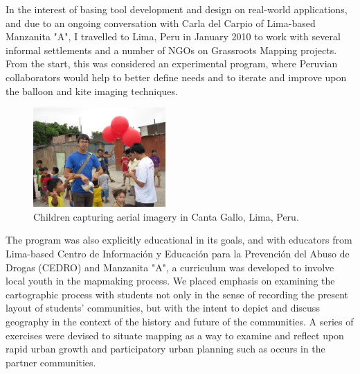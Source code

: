 \documentclass[11pt]{report}
\begin{document}
In the interest of basing tool development and design on real-world applications, and due to an ongoing conversation with Carla del Carpio of Lima-based Manzanita "A", I travelled to Lima, Peru in January 2010 to work with several informal settlements and a number of NGOs on Grassroots Mapping projects. From the start, this was considered an experimental program, where Peruvian collaborators would help to better define needs and to iterate and improve upon the balloon and kite imaging techniques.

\begin{figure}
	\begin{flushright}
		\includegraphics[width=0.45\textwidth]{images/kids-canta-gallo.jpg}
		\caption{Children capturing aerial imagery in Canta Gallo, Lima, Peru.}
	\end{flushright}
\end{figure}

The program was also explicitly educational in its goals, and with educators from Lima-based Centro de Información y Educación para la Prevención del Abuso de Drogas (CEDRO) and Manzanita "A", a curriculum was developed to involve local youth in the mapmaking process. We placed emphasis on examining the cartographic process with students not only in the sense of recording the present layout of students' communities, but with the intent to depict and discuss geography in the context of the history and future of the communities. A series of exercises were devised to situate mapping as a way to examine and reflect upon rapid urban growth and participatory urban planning such as occurs in the partner communities.
\end{document}
